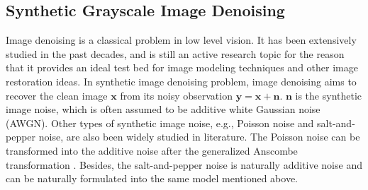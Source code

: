 \subsection{Synthetic Grayscale Image Denoising}
\label{sec:review:sys}

Image denoising is a classical problem in low level vision. It has been extensively studied in the past decades, and is still an active research topic for the reason that it provides an ideal test bed for image modeling techniques and other image restoration ideas. In synthetic image denoising problem, image denoising aims to recover the clean image $\mathbf{x}$ from its noisy observation $\mathbf{y} = \mathbf{x} + \mathbf{n}$. $\mathbf{n}$ is the synthetic image noise, which is often assumed to be additive white Gaussian noise (AWGN). Other types of synthetic image noise, e.g., Poisson noise and salt-and-pepper noise, are also been widely studied in literature. The Poisson noise can be transformed into the additive noise after the generalized Anscombe transformation \cite{makitalo2013optimal}. Besides, the salt-and-pepper noise is naturally additive noise and can be naturally formulated into the same model mentioned above.

